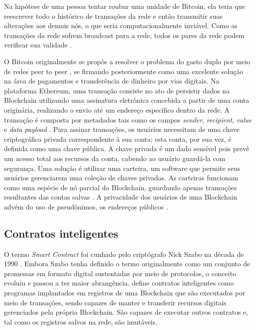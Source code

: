 Na hipótese de uma pessoa tentar roubar uma unidade de Bitcoin, ela teria que reescrever todo o histórico de transações da rede \cite{Tapscott2016} e então transmitir suas alterações aos demais nós, o que seria computacionalmente inviável. Como as transações da rede sofrem broadcast para a rede, todos os pares da rede podem verificar sua validade \cite{Karame2016-qb}.

O Bitcoin originalmente se propôs a resolver o problema do gasto duplo por meio de redes peer to peer \cite{nakamoto2009bitcoin}, se firmando posteriormente como uma excelente solução na área de pagamentos e transferência de dinheiro por vias digitais. Na plataforma Ethereum, uma transação consiste no ato de persistir dados na Blockchain utilizando uma assinatura eletrônica concebida a partir de uma conta originária, realizando o envio até um endereço específico dentro da rede. A transação é composta por metadados tais como os campos \emph{sender}, \emph{recipient}, \emph{value} e \emph{data payload} \cite{Antonopoulos2018-jt}. Para assinar transações, os usuários necessitam de uma chave criptográfica privada correspondente à sua conta; esta conta, por sua vez, é definida como uma chave pública. A chave privada é um dado sensível pois prevê um acesso total aos recursos da conta, cabendo ao usuário guardá-la com segurança. Uma solução é utilizar uma carteira, um software que permite seus usuários gerenciarem uma coleção de chaves privadas. As carteiras funcionam como uma espécie de nó parcial do Blockchain, guardando apenas transações resultantes das contas salvas \cite{Xu2019-qi}. A privacidade dos usuários de uma Blockchain advém do uso de pseudônimos, os endereços públicos \cite{Karame2016-qb}.

\subsection{Contratos inteligentes}
O termo \emph{Smart Contract} foi cunhado pelo criptógrafo Nick Szabo na década de 1990 \cite{Antonopoulos2018-jt}. Embora Szabo tenha definido o termo originalmente como um conjunto de promessas em formato digital sustentadas por meio de protocolos, o conceito evoluiu e passou a ter maior abrangência. \cite{Xu2019-qi} define contratos inteligentes como programas implantados em registros de uma Blockchain que são executados por meio de transações, sendo capazes de manter e transferir recursos digitais gerenciados pela própria Blockchain. São capazes de executar outros contratos e, tal como os registros salvos na rede, são imutáveis.

